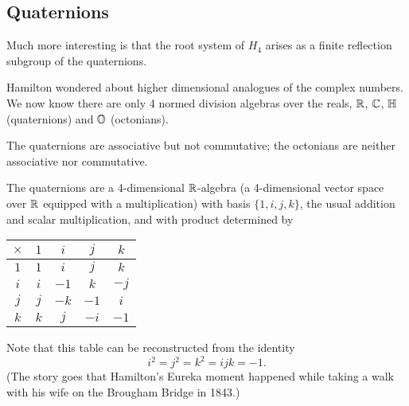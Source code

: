\subsection{Quaternions}

Much more interesting is that the root system of $H_4$ arises as a finite
reflection subgroup of the quaternions.

Hamilton wondered about higher dimensional analogues of the complex numbers.
We now know there are only 4 normed division algebras over the reals, $\mathbb{R}$,
$\mathbb{C}$, $\mathbb{H}$ (quaternions) and $\mathbb{O}$ (octonians).

The quaternions are associative but not commutative; the octonians are neither
associative nor commutative.

The quaternions are a 4-dimensional $\mathbb{R}$-algebra (a 4-dimensional vector space
over $\mathbb{R}$ equipped with a multiplication) with basis $\{1, i, j, k\}$, the
usual addition and scalar multiplication, and with product determined by

\begin{tabular}{c|cccc}
$\times$ & $1$ & $i$ & $j$ & $k$ \\
\hline
$1$ & $1$ & $i$ & $j$ & $k$ \\
$i$ & $i$ & $-1$ & $k$ & $-j$ \\
$j$ & $j$ & $-k$ & $-1$ & $i$ \\
$k$ & $k$ & $j$ & $-i$ & $-1$
\end{tabular}

Note that this table can be reconstructed from the identity
\[
    i^2 = j^2 = k^2 = ijk = -1.
\]
(The story goes that Hamilton's Eureka moment happened while taking a walk with
his wife on the Brougham Bridge in 1843.)
